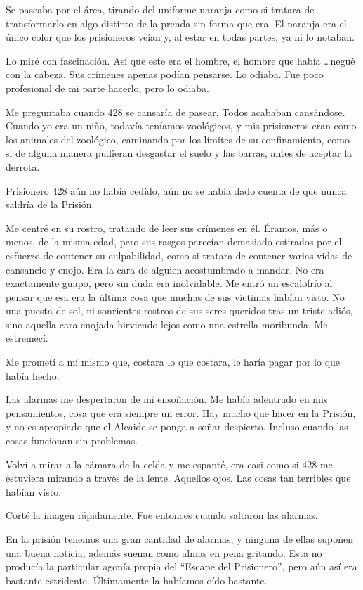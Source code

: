 Se paseaba por el área, tirando del uniforme naranja como si tratara de
transformarlo en algo distinto de la prenda sin forma que era. El
naranja era el único color que los prisioneros veían y, al estar en
todas partes, ya ni lo notaban.

Lo miré con fascinación. Así que este era el hombre, el hombre que había
\ldots{}negué con la cabeza. Sus crímenes apenas podían pensarse. Lo
odiaba. Fue poco profesional de mi parte hacerlo, pero lo odiaba.

Me preguntaba cuando 428 se cansaría de pasear. Todos acababan
cansándose. Cuando yo era un niño, todavía teníamos zoológicos, y mis
prisioneros eran como los animales del zoológico, caminando por los
límites de su confinamiento, como si de alguna manera pudieran desgastar
el suelo y las barras, antes de aceptar la derrota.

Prisionero 428 aún no había cedido, aún no se había dado cuenta de que
nunca saldría de la Prisión.

Me centré en su rostro, tratando de leer sus crímenes en él. Éramos, más
o menos, de la misma edad, pero sus rasgos parecían demasiado estirados
por el esfuerzo de contener su culpabilidad, como si tratara de contener
varias vidas de cansancio y enojo. Era la cara de alguien acostumbrado a
mandar. No era exactamente guapo, pero sin duda era inolvidable. Me
entró un escalofrío al pensar que esa era la última cosa que muchas de
sus víctimas habían visto. No una puesta de sol, ni sonrientes rostros
de sus seres queridos tras un triste adiós, sino aquella cara enojada
hirviendo lejos como una estrella moribunda. Me estremecí.

Me prometí a mí mismo que, costara lo que costara, le haría pagar por lo
que había hecho.

Las alarmas me despertaron de mi ensoñación. Me había adentrado en mis
pensamientos, cosa que era siempre un error. Hay mucho que hacer en la
Prisión, y no es apropiado que el Alcaide se ponga a soñar despierto.
Incluso cuando las cosas funcionan sin problemas.

Volví a mirar a la cámara de la celda y me espanté, era casi como si 428
me estuviera mirando a través de la lente. Aquellos ojos. Las cosas tan
terribles que habían visto.

Corté la imagen rápidamente. Fue entonces cuando saltaron las alarmas.

En la prisión tenemos una gran cantidad de alarmas, y ninguna de ellas
suponen una buena noticia, además suenan como almas en pena gritando.
Esta no producía la particular agonía propia del ``Escape del
Prisionero'', pero aún así era bastante estridente. Últimamente la
habíamos oído bastante.

